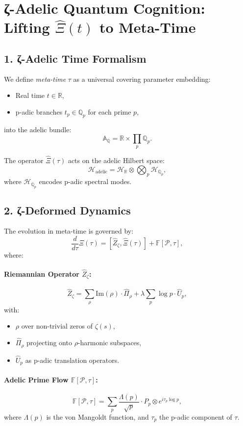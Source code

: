 \documentclass[12pt]{article}
\theoremstyle{plain}
\begin{document}
\section{ζ-Adelic Quantum Cognition: Lifting \(\hat{\Xi}(t)\) to Meta-Time}

\subsection*{1. ζ-Adelic Time Formalism}

We define \emph{meta-time} \( \tau \) as a universal covering parameter embedding:
\begin{itemize}
    \item Real time \( t \in \mathbb{R} \),
    \item p-adic branches \( t_p \in \mathbb{Q}_p \) for each prime \( p \),
\end{itemize}
into the adelic bundle:
\[
\mathbb{A}_\mathbb{Q} = \mathbb{R} \times \prod_p \mathbb{Q}_p.
\]

The operator \( \hat{\Xi}(\tau) \) acts on the adelic Hilbert space:
\[
\mathcal{H}_{\text{adelic}} = \mathcal{H}_\mathbb{R} \otimes \bigotimes_p \mathcal{H}_{\mathbb{Q}_p},
\]
where \( \mathcal{H}_{\mathbb{Q}_p} \) encodes p-adic spectral modes.

\subsection*{2. ζ-Deformed Dynamics}

The evolution in meta-time is governed by:
\[
\frac{d}{d\tau} \hat{\Xi}(\tau) = [ \hat{Z}_\zeta, \hat{\Xi}(\tau) ] + \mathbb{F}[\mathcal{P}, \tau],
\]
where:

\paragraph*{Riemannian Operator \( \hat{Z}_\zeta \):}
\[
\hat{Z}_\zeta = \sum_{\rho} \text{Im}(\rho) \cdot \hat{\Pi}_\rho + \lambda \sum_{p} \log p \cdot \hat{U}_p,
\]
with:
\begin{itemize}
    \item \( \rho \) over non-trivial zeros of \( \zeta(s) \),
    \item \( \hat{\Pi}_\rho \) projecting onto \( \rho \)-harmonic subspaces,
    \item \( \hat{U}_p \) as p-adic translation operators.
\end{itemize}

\paragraph*{Adelic Prime Flow \( \mathbb{F}[\mathcal{P}, \tau] \):}
\[
\mathbb{F}[\mathcal{P}, \tau] = \sum_p \frac{\Lambda(p)}{\sqrt{p}} \cdot \hat{P}_p \otimes e^{i \tau_p \log p},
\]
where \( \Lambda(p) \) is the von Mangoldt function, and \( \tau_p \) the p-adic component of \( \tau \).
\end{document}
